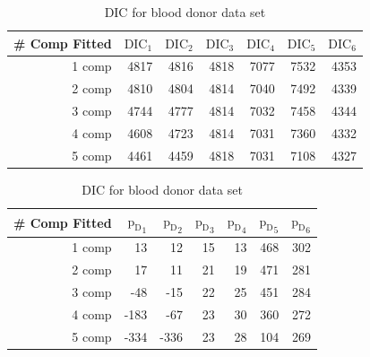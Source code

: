 \begin{table}[!htb]
\centering
\caption{DIC for blood donor data set}
\label{table : dic_blood_donor}
\begin{tabular}{@{}rrrrrrr@{}}
\toprule
\# Comp Fitted & $\text{DIC}_1$ & $\text{DIC}_2$  & $\text{DIC}_3$  & $\text{DIC}_4$  & $\text{DIC}_5$  & $\text{DIC}_6$  \\ \midrule
1 comp & 4817 & 4816 & 4818 & 7077 & 7532 & 4353 \\
2 comp & 4810 & 4804 & 4814 & 7040 & 7492 & 4339 \\
3 comp & 4744 & 4777 & 4814 & 7032 & 7458 & 4344 \\
4 comp & 4608 & 4723 & 4814 & 7031 & 7360 & 4332 \\
5 comp & 4461 & 4459 & 4818 & 7031 & 7108 & 4327 \\ \bottomrule
\end{tabular}
\begin{tabular}{@{}rrrrrrr@{}}
\toprule
\# Comp Fitted & ${\text{p}_\text{D}}_1$ & ${\text{p}_\text{D}}_2$ & ${\text{p}_\text{D}}_3$ & ${\text{p}_\text{D}}_4$ & ${\text{p}_\text{D}}_5$ & ${\text{p}_\text{D}}_6$ \\ \midrule
1 comp & 13 & 12 & 15 & 13 & 468 & 302 \\
2 comp & 17 & 11 & 21 & 19 & 471 & 281 \\
3 comp & -48 & -15 & 22 & 25 & 451 & 284 \\
4 comp & -183 & -67 & 23 & 30 & 360 & 272 \\
5 comp & -334 & -336 & 23 & 28 & 104 & 269 \\ \bottomrule
\end{tabular}
\end{table}

